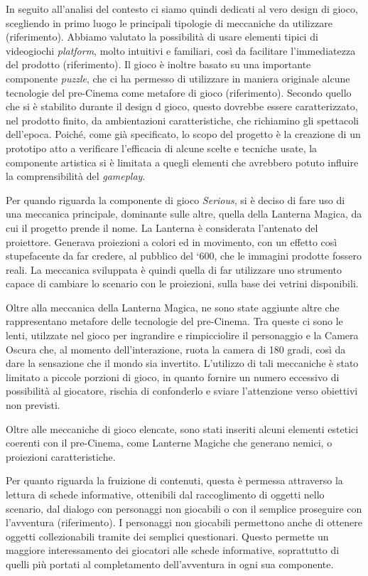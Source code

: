 In seguito all’analisi del contesto ci siamo quindi dedicati al vero design di gioco, scegliendo in primo luogo le principali tipologie di meccaniche da utilizzare (riferimento). Abbiamo valutato la possibilità di usare elementi tipici di videogiochi \textit{platform}, molto intuitivi e familiari, così da facilitare l’immediatezza del prodotto (riferimento). Il gioco è inoltre basato su una importante componente \textit{puzzle}, che ci ha permesso di utilizzare in maniera originale alcune tecnologie del pre-Cinema come metafore di gioco (riferimento).
Secondo quello che si è stabilito durante il design d gioco, questo dovrebbe essere caratterizzato, nel prodotto finito, da ambientazioni caratteristiche, che richiamino gli spettacoli dell’epoca. Poiché, come già specificato, lo scopo del progetto è la creazione di un prototipo atto a verificare l’efficacia di alcune scelte e tecniche usate, la componente artistica si è limitata a quegli elementi che avrebbero potuto influire la comprensibilità del \textit{gameplay}.

Per quando riguarda la componente di gioco \textit{Serious}, si è deciso di fare uso di una meccanica principale, dominante sulle altre, quella della Lanterna Magica, da cui il progetto prende il nome. La Lanterna è considerata l’antenato del proiettore. Generava proiezioni a colori ed in movimento, con un effetto così stupefacente da far credere, al pubblico del ‘600, che le immagini prodotte fossero reali. La meccanica sviluppata è quindi quella di far utilizzare uno strumento capace di cambiare lo scenario con le proiezioni, sulla base dei vetrini disponibili.

Oltre alla meccanica della Lanterna Magica, ne sono state aggiunte altre che rappresentano metafore delle tecnologie del pre-Cinema. Tra queste ci sono le lenti, utilzzate nel gioco per ingrandire e rimpicciolire il personaggio e la Camera Oscura che, al momento dell’interazione, ruota la camera di 180 gradi, così da dare la sensazione che il mondo sia invertito. L’utilizzo di tali meccaniche è stato limitato a piccole porzioni di gioco, in quanto fornire un numero eccessivo di possibilità al giocatore, rischia di confonderlo e sviare l’attenzione verso obiettivi non previsti.

Oltre alle meccaniche di gioco elencate, sono stati inseriti alcuni elementi estetici coerenti con il pre-Cinema, come Lanterne Magiche che generano nemici, o proiezioni caratteristiche.

Per quanto riguarda la fruizione di contenuti, questa è permessa attraverso la lettura di schede informative, ottenibili dal raccoglimento di oggetti nello scenario, dal dialogo con personaggi non giocabili o con il semplice proseguire con l’avventura (riferimento).
I personaggi non giocabili permettono anche di ottenere oggetti collezionabili tramite dei semplici questionari. Questo permette un maggiore interessamento dei giocatori alle schede informative, soprattutto di quelli più portati al completamento dell’avventura in ogni sua componente.

